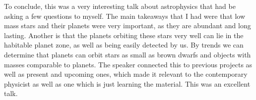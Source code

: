 \documentclass[12pt]{article}
\begin{document}
To conclude, this was a very interesting talk about astrophysics that had be asking a few questions to myself. The main takeaways that I had were that low mass stars and their planets were very important, as they are abundant and long lasting. Another is that the planets orbiting these stars very well can lie in the habitable planet zone, as well as being easily detected by us. By trends we can determine that planets can orbit stars as small as brown dwarfs and objects with masses comparable to planets. The speaker connected this to previous projects as well as present and upcoming ones, which made it relevant to the contemporary physicist as well as one which is just learning the material. This was an excellent talk. 
\end{document}
